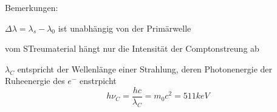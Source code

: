 \begin{erlit}{Bemerkungen:}
    \item
    $\Delta \lambda = \lambda_s - \lambda_0$ ist unabhängig von der Primärwelle
    \item
    vom STreumaterial hängt nur die Intensität der Comptonstreung ab
    \item
    $\lambda_C$ entspricht der Wellenlänge einer Strahlung, deren Photonenergie
    der Ruheenergie des $e^-$ enstrpicht
    \begin{equation*}
        h \nu_C = \frac{hc}{\lambda_C} = m_0 c^2 = 511keV
    \end{equation*}
\end{erlit}
